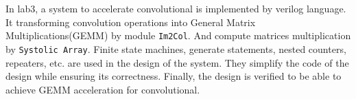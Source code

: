 \documentclass[conference]{IEEEtran}
\begin{document}
In lab3, a system to accelerate convolutional is implemented by verilog language.
It transforming convolution operations into General Matrix Multiplications(GEMM) by module \verb|Im2Col|.
And compute matrices multiplication by \verb|Systolic Array|.
Finite state machines, generate statements, nested counters, repeaters, etc.
are used in the design of the system.
They simplify the code of the design while ensuring its correctness.
Finally, the design is verified to be able to achieve GEMM acceleration for convolutional.
\end{document}
